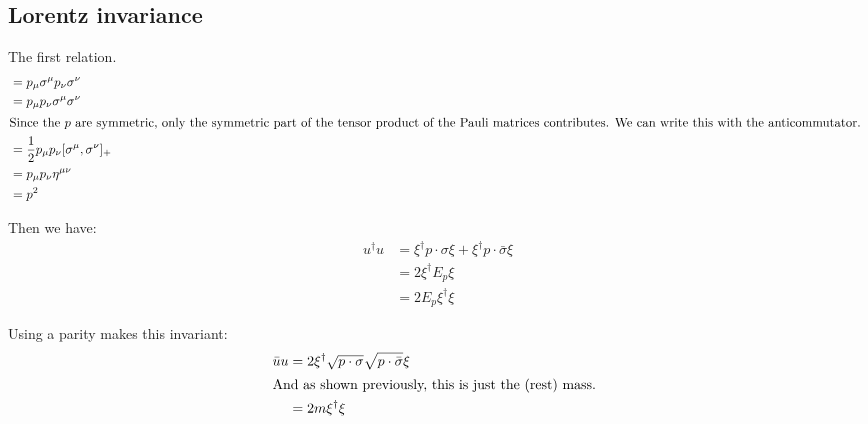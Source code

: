 \documentclass[11pt, english, fleqn, DIV=15, headinclude, BCOR=1cm]{scrartcl}
\begin{document}
\subsection{Lorentz invariance}

The first relation.
\begin{align*}
    [p \cdot \sigma][p \cdot \bar\sigma]
    &= p_\mu \sigma^\mu p_\nu \sigma^\nu \\
    &= p_\mu p_\nu \sigma^\mu \sigma^\nu \\
    \intertext{%
        Since the $p$ are symmetric, only the symmetric part of the tensor
        product of the Pauli matrices contributes. We can write this with the
        anticommutator.
    }
    &= \frac12 p_\mu p_\nu [\sigma^\mu, \sigma^\nu]_+ \\
    &= p_\mu p_\nu \eta^{\mu\nu} \\
    &= p^2
\end{align*}

Then we have:
\begin{align*}
    u^\dagger u
    &= \xi^\dagger p \cdot \sigma \xi + \xi^\dagger p \cdot \bar\sigma \xi \\
    &= 2 \xi^\dagger E_p \xi \\
    &= 2 E_p \xi^\dagger \xi
\end{align*}

Using a parity makes this invariant:
\begin{align*}
    \bar u u
    &= 2 \xi^\dagger \sqrt{p \cdot \sigma} \sqrt{p \cdot \bar\sigma} \xi \\
    \intertext{%
        And as shown previously, this is just the (rest) mass.
    }
    &= 2 m \xi^\dagger \xi
\end{align*}
\end{document}
